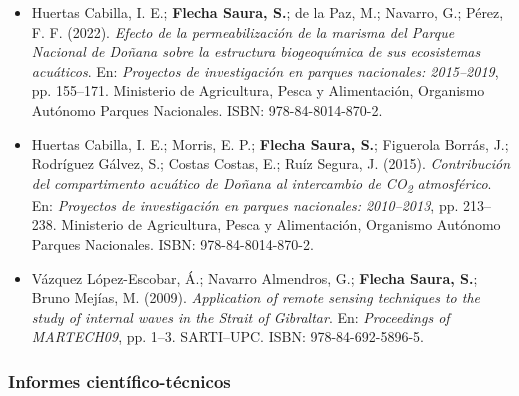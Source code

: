 \documentclass[11pt,a4paper]{article}
\begin{document}
\begin{itemize}[leftmargin=*]

    \item Huertas Cabilla, I. E.; \textbf{Flecha Saura, S.}; de la Paz, M.; Navarro, G.; Pérez, F. F. (2022). 
    \textit{Efecto de la permeabilización de la marisma del Parque Nacional de Doñana sobre la estructura biogeoquímica de sus ecosistemas acuáticos}. 
    En: \textit{Proyectos de investigación en parques nacionales: 2015--2019}, pp. 155--171. 
    Ministerio de Agricultura, Pesca y Alimentación, Organismo Autónomo Parques Nacionales. 
    ISBN: 978-84-8014-870-2.

    \item Huertas Cabilla, I. E.; Morris, E. P.; \textbf{Flecha Saura, S.}; Figuerola Borrás, J.; Rodríguez Gálvez, S.; Costas Costas, E.; Ruíz Segura, J. (2015). 
    \textit{Contribución del compartimento acuático de Doñana al intercambio de CO\textsubscript{2} atmosférico}. 
    En: \textit{Proyectos de investigación en parques nacionales: 2010--2013}, pp. 213--238. 
    Ministerio de Agricultura, Pesca y Alimentación, Organismo Autónomo Parques Nacionales. 
    ISBN: 978-84-8014-870-2.

    \item Vázquez López-Escobar, Á.; Navarro Almendros, G.; \textbf{Flecha Saura, S.}; Bruno Mejías, M. (2009). 
    \textit{Application of remote sensing techniques to the study of internal waves in the Strait of Gibraltar}. 
    En: \textit{Proceedings of MARTECH09}, pp. 1--3. SARTI--UPC. 
    ISBN: 978-84-692-5896-5.

\end{itemize}

\subsubsection{Informes científico-técnicos}
\end{document}

